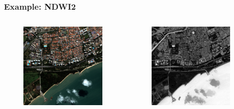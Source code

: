 \documentclass[compress]{beamer}
\begin{document}
\begin{frame}
\frametitle{Example: NDWI2}
\begin{columns}
\begin{column}{0.5\textwidth}
\begin{figure}[]
  \includegraphics[width=1.0\textwidth]{radio2-extract-3b.jpg}
\end{figure}
\end{column}
\begin{column}{0.5\textwidth}
\begin{figure}[]
  \includegraphics[width=1.0\textwidth]{Radiometry-NDWI2.jpg}
\end{figure}
\end{column}
\end{columns}
\end{frame}
\end{document}
